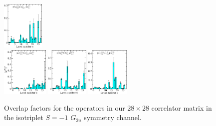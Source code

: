 \begin{figure}[H]
    \includegraphics[width=0.18\textwidth]{figures/sigmas/g2u/zfactors/zfactor_isotriplet_pion_sigma-G2u_1-P011-A2m-SS_0-P0-1-1-G-SS_17.pdf}\\[-0.2cm]
    \includegraphics[width=0.1975\textwidth]{figures/sigmas/g2u/zfactors/zfactor_isotriplet_pion_sigma-G2u_1-P011-A2m-SS_0-P0-1-1-G-SS_18.pdf}
    \includegraphics[width=0.18\textwidth]{figures/sigmas/g2u/zfactors/zfactor_isotriplet_pion_sigma-G2u_1-P011-A2m-SS_1-P0-1-1-G-SS_1.pdf}
    \includegraphics[width=0.18\textwidth]{figures/sigmas/g2u/zfactors/zfactor_isotriplet_pion_sigma-G2u_1-P111-A2m-SS_0-P-1-1-1-G-SS_4.pdf}
    \caption{Overlap factors for the operators in our $28\times 28$ correlator matrix in the isotriplet $S=-1$ $G_{2u}$ symmetry channel.}\label{fig:g2u_zfactors}
\end{figure}

